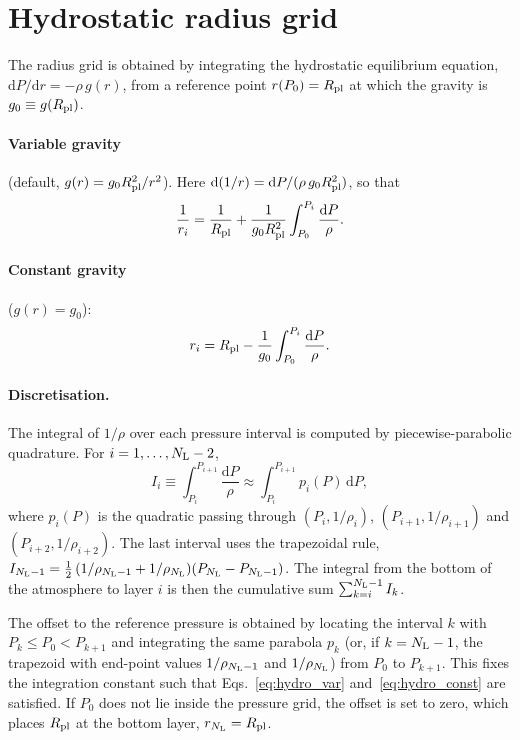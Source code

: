 \documentclass[11pt,a4paper]{article}
\newcommand{\Rpl}{R_{\rm pl}}
\newcommand{\Ntot}{N_{\rm L}}
\begin{document}
\section{Hydrostatic radius grid}
\label{sec:hydrostatic}

The radius grid is obtained by integrating the hydrostatic equilibrium
equation, $\mathrm{d}P/\mathrm{d}r = -\rho\, g(r)$, from a reference point
$r(P_0) = \Rpl$ at which the gravity is $g_0 \equiv g(\Rpl)$.

\paragraph{Variable gravity} (default, $g(r) = g_0\Rpl^2/r^2$). Here
$\mathrm{d}(1/r) = \mathrm{d}P/(\rho\, g_0 \Rpl^2)$, so that
\begin{equation}
  \frac{1}{r_i} = \frac{1}{\Rpl}
  + \frac{1}{g_0\Rpl^2}\int_{P_0}^{P_i}\frac{\mathrm{d}P}{\rho} .
  \label{eq:hydro_var}
\end{equation}

\paragraph{Constant gravity} ($g(r) = g_0$):
\begin{equation}
  r_i = \Rpl - \frac{1}{g_0}\int_{P_0}^{P_i}\frac{\mathrm{d}P}{\rho} .
  \label{eq:hydro_const}
\end{equation}

\paragraph{Discretisation.}
The integral of $1/\rho$ over each pressure interval is computed by
piecewise-parabolic quadrature. For $i = 1,\dots,\Ntot-2$,
\begin{equation}
  I_i \equiv \int_{P_i}^{P_{i+1}} \frac{\mathrm{d}P}{\rho}
  \approx \int_{P_i}^{P_{i+1}} p_i(P)\,\mathrm{d}P ,
\end{equation}
where $p_i(P)$ is the quadratic passing through
$(P_i,1/\rho_i)$, $(P_{i+1},1/\rho_{i+1})$ and $(P_{i+2},1/\rho_{i+2})$.
The last interval uses the trapezoidal rule,
$I_{\Ntot-1} = \tfrac12\,(1/\rho_{\Ntot-1} + 1/\rho_{\Ntot})(P_{\Ntot}-P_{\Ntot-1})$.
The integral from the bottom of the atmosphere to layer $i$ is then the
cumulative sum $\sum_{k=i}^{\Ntot-1} I_k$.

The offset to the reference pressure is obtained by locating the interval
$k$ with $P_k \le P_0 < P_{k+1}$ and integrating the same parabola $p_k$
(or, if $k = \Ntot-1$, the trapezoid with end-point values
$1/\rho_{\Ntot-1}$ and $1/\rho_{\Ntot}$) from $P_0$ to $P_{k+1}$. This
fixes the integration constant such that Eqs.~\eqref{eq:hydro_var}
and~\eqref{eq:hydro_const} are satisfied. If $P_0$ does not lie inside the
pressure grid, the offset is set to zero, which places $\Rpl$ at the bottom
layer, $r_{\Ntot} = \Rpl$.
\end{document}
